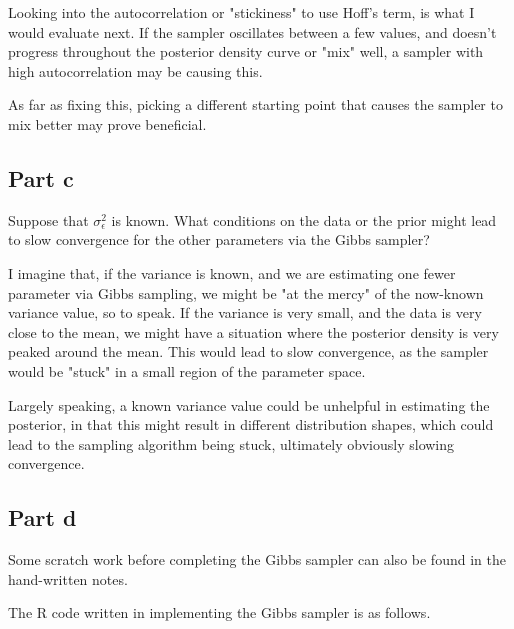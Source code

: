 \documentclass[12pt, letterpaper]{article}
\begin{document}
Looking into the autocorrelation or "stickiness" to use Hoff's term, is what I would evaluate next. If the sampler oscillates between a few values, and doesn't progress throughout the posterior density curve or "mix" well, a sampler with high autocorrelation may be causing this. 

As far as fixing this, picking a different starting point that causes the sampler to mix better may prove beneficial. 

\subsection{Part c} 

Suppose that $\sigma_{\epsilon}^2$ is known. What conditions on the data or the prior might lead to slow convergence for the other parameters via the Gibbs sampler?

I imagine that, if the variance is known, and we are estimating one fewer parameter via Gibbs sampling, we might be "at the mercy" of the now-known variance value, so to speak. If the variance is very small, and the data is very close to the mean, we might have a situation where the posterior density is very peaked around the mean. This would lead to slow convergence, as the sampler would be "stuck" in a small region of the parameter space. 

Largely speaking, a known variance value could be unhelpful in estimating the posterior, in that this might result in different distribution shapes, which could lead to the sampling algorithm being stuck, ultimately obviously slowing convergence. 

\subsection{Part d} 

Some scratch work before completing the Gibbs sampler can also be found in the hand-written notes. 

The R code written in implementing the Gibbs sampler is as follows. 
\end{document}
